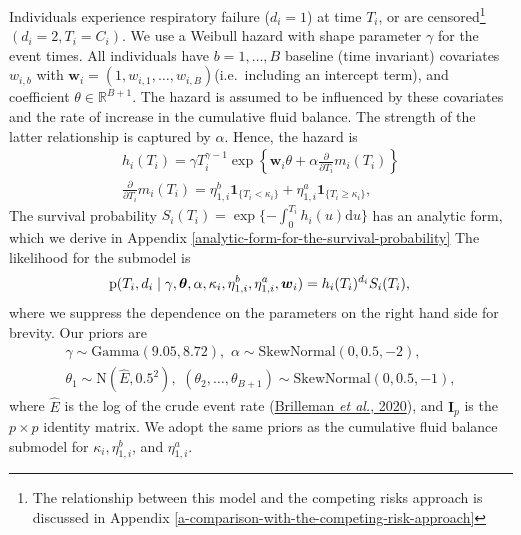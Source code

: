 \documentclass[
  10pt,
  a4paper,
]{article}
\newcommand{\pd}{\text{p}}
\begin{document}
Individuals experience respiratory failure (\(d_{i} = 1\)) at time
\(T_{i}\), or are censored\footnote{The relationship between this model
  and the competing risks approach is discussed in Appendix
  \ref{a-comparison-with-the-competing-risk-approach}}
\((d_{i} = 2, T_{i} = C_{i})\). We use a Weibull hazard with shape
parameter \(\gamma\) for the event times. All individuals have
\(b = 1, \ldots, B\) baseline (time invariant) covariates \(w_{i, b}\)
with
\(\boldsymbol{w}_{i} = (1, w_{i, 1}, \ldots, w_{i, B})\)(i.e.~including
an intercept term), and coefficient \(\theta \in \mathbb{R}^{B + 1}\).
The hazard is assumed to be influenced by these covariates and the rate
of increase in the cumulative fluid balance. The strength of the latter
relationship is captured by \(\alpha\). Hence, the hazard is
\begin{gather}
  h_{i}(T_{i}) = \gamma T_{i}^{\gamma - 1} \exp\left\{\boldsymbol{w}_{i}\theta + \alpha \frac{\partial}{\partial T_{i}} m_{i}(T_{i})\right\} \\
  \frac{\partial}{\partial T_{i}} m_{i}(T_{i}) = \eta^{b}_{1, i}\boldsymbol{1}_{\{T_{i} < \kappa_{i}\}} + \eta^{a}_{1, i}\boldsymbol{1}_{\{T_{i} \geq \kappa_{i}\}},
\end{gather} The survival probability
\(S_{i}(T_{i}) = \exp\{-\int_{0}^{T_{i}}h_{i}(u)\text{d}u\}\) has an
analytic form, which we derive in Appendix
\ref{analytic-form-for-the-survival-probability} The likelihood for the
submodel is \begin{equation}
  \pd(T_{i}, d_{i} \mid \gamma, \boldsymbol{\theta}, \alpha, \kappa_{i}, \eta_{1, i}^{b}, \eta_{1, i}^{a}, \boldsymbol{w}_{i}) = h_{i}(T_{i})^{d_{i}} S_{i}(T_{i}), \\
\end{equation} where we suppress the dependence on the parameters on the
right hand side for brevity. Our priors are \begin{equation}
\begin{gathered}
  \gamma \sim \text{Gamma}(9.05, 8.72), \, \,
  \alpha \sim \text{SkewNormal}(0, 0.5, -2), \\
  \theta_{1} \sim \text{N}(\hat{E}, 0.5^2), \, \,
  (\theta_{2}, \ldots, \theta_{B + 1}) \sim \text{SkewNormal}(0, 0.5, -1),
  \label{eqn:surv-submodel-prior-def}
\end{gathered}
\end{equation} where \(\hat{E}\) is the log of the crude event rate
(\protect\hyperlink{ref-brilleman_bayesian_2020}{Brilleman \emph{et
al.}, 2020}), and \(\boldsymbol{I}_{p}\) is the \(p \times p\) identity
matrix. We adopt the same priors as the cumulative fluid balance
submodel for \(\kappa_{i}, \eta_{1, i}^{b}\), and \(\eta_{1, i}^{a}\).
\end{document}
